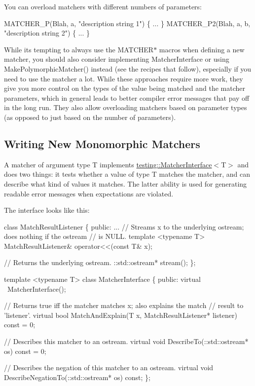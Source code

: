 You can overload matchers with different numbers of parameters\+: 
\begin{DoxyCode}
MATCHER\_P(Blah, a, "description string 1") \{ ... \}
MATCHER\_P2(Blah, a, b, "description string 2") \{ ... \}
\end{DoxyCode}


While it\textquotesingle{}s tempting to always use the {\ttfamily M\+A\+T\+C\+H\+E\+R$\ast$} macros when defining a new matcher, you should also consider implementing {\ttfamily Matcher\+Interface} or using {\ttfamily Make\+Polymorphic\+Matcher()} instead (see the recipes that follow), especially if you need to use the matcher a lot. While these approaches require more work, they give you more control on the types of the value being matched and the matcher parameters, which in general leads to better compiler error messages that pay off in the long run. They also allow overloading matchers based on parameter types (as opposed to just based on the number of parameters).

\subsection*{Writing New Monomorphic Matchers}

A matcher of argument type {\ttfamily T} implements {\ttfamily \hyperlink{classtesting_1_1_matcher_interface}{testing\+::\+Matcher\+Interface}$<$T$>$} and does two things\+: it tests whether a value of type {\ttfamily T} matches the matcher, and can describe what kind of values it matches. The latter ability is used for generating readable error messages when expectations are violated.

The interface looks like this\+:


\begin{DoxyCode}
class MatchResultListener \{
 public:
  ...
  // Streams x to the underlying ostream; does nothing if the ostream
  // is NULL.
  template <typename T>
  MatchResultListener& operator<<(const T& x);

  // Returns the underlying ostream.
  ::std::ostream* stream();
\};

template <typename T>
class MatcherInterface \{
 public:
  virtual ~MatcherInterface();

  // Returns true iff the matcher matches x; also explains the match
  // result to 'listener'.
  virtual bool MatchAndExplain(T x, MatchResultListener* listener) const = 0;

  // Describes this matcher to an ostream.
  virtual void DescribeTo(::std::ostream* os) const = 0;

  // Describes the negation of this matcher to an ostream.
  virtual void DescribeNegationTo(::std::ostream* os) const;
\};
\end{DoxyCode}


